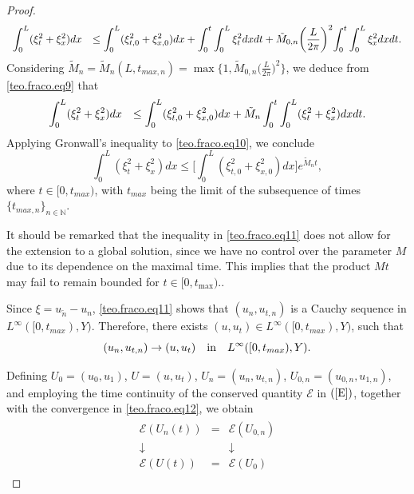 \documentclass[12pt,reqno,a4paper]{amsart} %
\numberwithin{equation}{section}
\numberwithin{figure}{section}
\begin{document}
\begin{proof}
\begin{equation} \label{teo.fraco.eq9}\begin{array}{lllll}
		\displaystyle	\displaystyle\int_0^L(\xi_t^2+\xi_x^2)dx&\leq \displaystyle 	\displaystyle\int_0^L(\xi_{t,0}^2+\xi_{x,0}^2)dx+\displaystyle	\int_0^t\int_0^L\xi_t^2 dxdt +\displaystyle	\tilde{M}_{0,n} \biggl(\frac{L}{2\pi}\biggl)^2\int_0^t\int_0^L\xi_x^2dxdt. 
	\end{array}
\end{equation}Considering $\tilde{M}_n=\tilde{M}_n(L,t_{max,n})= \max \biggl\{ 1, 	\tilde{M}_{0,n} \biggl(\frac{L}{2\pi}\biggl)^2 \biggl\}$, we deduce from \eqref{teo.fraco.eq9} that 
\begin{equation} \label{teo.fraco.eq10}\begin{array}{lllll}
		\displaystyle	\displaystyle\int_0^L(\xi_t^2+\xi_x^2)dx&\leq \displaystyle 	\displaystyle\int_0^L(\xi_{t,0}^2+\xi_{x,0}^2)dx+\displaystyle	\tilde{M}_n\int_0^t\int_0^L(\xi_t^2 +\xi_x^2 )dxdt  . 
	\end{array}
\end{equation}
Applying Gronwall's inequality to \eqref{teo.fraco.eq10}, we conclude
\begin{equation} \label{teo.fraco.eq11} 
	 	\displaystyle\int_0^L(\xi_t^2+\xi_x^2)dx \leq \biggl[\int_0^L(\xi_{t,0}^2+\xi_{x,0}^2)dx\biggl ] e^{\tilde{M}_n t} ,
\end{equation}
where $t\in  [0,t_{max })$, with $t_{max}$ being the limit of the subsequence of times $\{t_{max,n}\}_{n\in \mathbb{N}}$.

It should be remarked that the inequality in \eqref{teo.fraco.eq11} does not allow for the extension to a global solution, since we have no control over the parameter $M$ due to its dependence on the maximal time. This implies that the product $Mt$ may fail to remain bounded for $t \in [0,t_{\max})$..
 
 
  Since $\xi=u_{\tilde{n}}-u_n$, \eqref{teo.fraco.eq11} shows that $	(u_n, u_{t,n})$ is a Cauchy sequence in $L^\infty([0,t_{max}),Y)$. Therefore, there exists $(u, u_t) \in L^\infty([0,t_{max}),Y)$, such that 
\begin{equation}  \label{teo.fraco.eq12}
	(u_n, u_{t,n})\rightarrow (u, u_t) \quad {\rm{in}} \quad L^\infty([0,t_{max}),Y).  
\end{equation}


Defining $U_0=(u_0,u_1)$, $U=(u, u_{t})$, $U_{n}=(u_n, u_{t,n})$, $U_{0,n}=(u_{0,n}, u_{1,n})$, and employing the time continuity of the conserved quantity  $\mathcal{E}$ in $(\ref{E})$, together with the convergence in \eqref{teo.fraco.eq12}, we obtain
\begin{align}\label{teo.fraco.eq13}
\begin{array}{ccc}
	\mathcal{E}(U_n(t)) & = & \mathcal{E}(U_{0,n}) \\
	\mathrel{\downarrow} & & \mathrel{\downarrow} \\
	\mathcal{E}(U(t)) & = & \mathcal{E}(U_0)
\end{array}
\end{align}


\end{proof}
\end{document}

